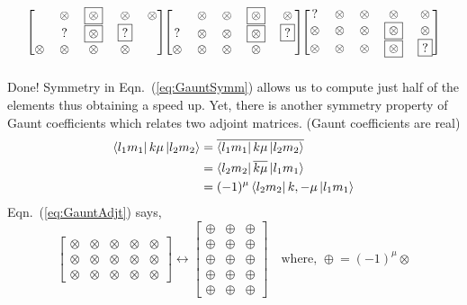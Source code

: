 \begin{equation*}
\begin{blockarray}{ccccc}
\begin{block}{[ccccc]}
   & \otimes & \boxed{\otimes} & \otimes & \otimes \\
   & ? & \boxed{\otimes} & \boxed{?} &  \\
  \otimes & \otimes & \otimes & \otimes & \phantom{\otimes} \\
\end{block}
\end{blockarray}
\begin{blockarray}{ccccc}
\begin{block}{[ccccc]}
   & \otimes & \otimes & \boxed{\otimes} & \otimes \\
  ? & \otimes & \otimes & \boxed{\otimes} & \boxed{?} \\
  \otimes & \otimes & \otimes & \otimes & \phantom{\otimes} \\
\end{block}
\end{blockarray}
\begin{blockarray}{ccccc}
\begin{block}{[ccccc]}
  ? & \otimes & \otimes & \otimes & \otimes \\
  \otimes & \otimes & \otimes & \boxed{\otimes} & \otimes \\
  \otimes & \otimes & \otimes & \boxed{\otimes} & \boxed{?} \\
\end{block}
\end{blockarray}
\end{equation*}
Done! Symmetry in Eqn.~(\ref{eq:GauntSymm}) allows us to compute just half of the
elements thus obtaining a speed up. Yet, there is another symmetry property
of Gaunt coefficients which relates two adjoint matrices. (Gaunt coefficients
are real)
\begin{align} \label{eq:GauntAdjt}
\Bra{l_1m_1}k\mu\Ket{l_2m_2}
& = \overline{\Bra{l_1m_1}k\mu\Ket{l_2m_2}} \nonumber \\
& = \Bra{l_2m_2}\overline{k\mu}\Ket{l_1m_1} \nonumber \\
& = (-1)^\mu\Bra{l_2m_2}k,-\mu\Ket{l_1m_1}
\end{align}
%
Eqn.~(\ref{eq:GauntAdjt}) says,
\begin{equation*}
\begin{bmatrix}
  \otimes & \otimes & \otimes & \boxed{\otimes} & \otimes \\
  \otimes & \otimes & \otimes & \otimes & \otimes \\
  \otimes & \otimes & \otimes & \otimes & \otimes
\end{bmatrix}
\longleftrightarrow
\begin{bmatrix}
  \oplus & \oplus & \oplus \\
  \oplus & \oplus & \oplus \\
  \oplus & \oplus & \oplus \\
  \boxed{\oplus} & \oplus & \oplus \\
  \oplus & \oplus & \oplus
\end{bmatrix}
\quad
\text{where, }
\boxed{\oplus} = (-1)^\mu\boxed{\otimes}
\end{equation*}
